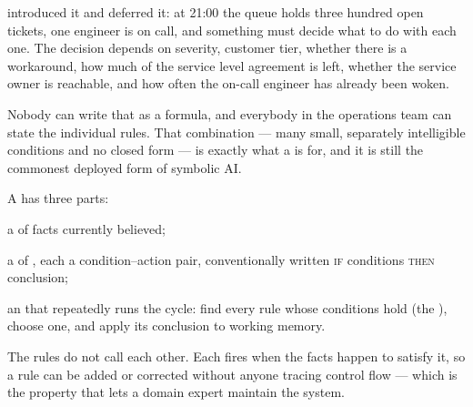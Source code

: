  introduced it and deferred it: at 21:00 the queue holds three hundred
open tickets, one engineer is on call, and something must decide what to do with
each one. The decision depends on severity, customer tier, whether there is a
workaround, how much of the service level agreement is left, whether the service
owner is reachable, and how often the on-call engineer has already been woken.

Nobody can write that as a formula, and everybody in the operations team can state
the individual rules. That combination --- many small, separately intelligible
conditions and no closed form --- is exactly what a 
is for, and it is still the commonest deployed form of symbolic AI.

\begin{definitionbox}
A  has three parts:
\begin{tight}
  \item a  of facts currently believed;
  \item a  of , each a condition--action
        pair, conventionally written \textsc{if} conditions \textsc{then}
        conclusion;
  \item an  that repeatedly runs the
         cycle: find every rule whose conditions hold
        (the ), choose one, and apply its conclusion to working
        memory.
\end{tight}
The rules do not call each other. Each fires when the facts happen to satisfy it,
so a rule can be added or corrected without anyone tracing control flow --- which
is the property that lets a domain expert maintain the system.
\end{definitionbox}

